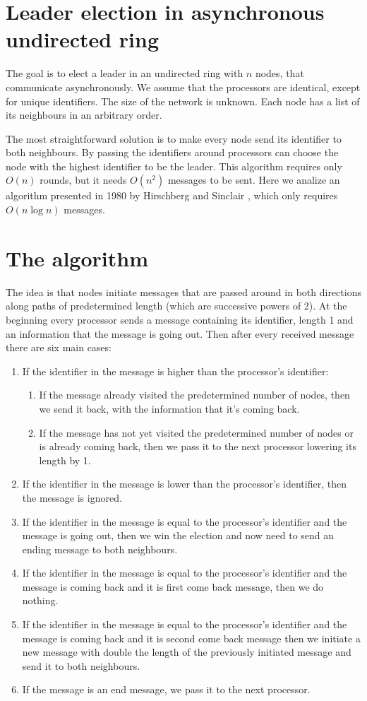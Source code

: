 \documentclass[a4paper,12pt]{article}
\begin{document}
\section{Leader election in asynchronous undirected ring}
The goal is to elect a leader in an undirected ring with $n$ nodes, that communicate asynchronously. We assume that the processors are identical, except for unique identifiers. The size of the network is unknown. Each node has a list of its neighbours in an arbitrary order.\par
The most straightforward solution is to make every node send its identifier to both neighbours. By passing the identifiers around processors can choose the node with the highest identifier to be the leader. This algorithm requires only $O(n)$ rounds, but it needs $O(n^2)$ messages to be sent. Here we analize an algorithm presented in 1980 by Hirschberg and Sinclair \cite{10.1145/359024.359029}, which only requires $O(n\log n)$ messages.

\section{The algorithm}
The idea is that nodes initiate messages that are passed around in both directions along paths of predetermined length (which are successive powers of 2). At the beginning every processor sends a message containing its identifier, length 1 and an information that the message is going out. Then after every received message there are six main cases:
\begin{enumerate}
    \item If the identifier in the message is higher than the processor's identifier:
    \begin{enumerate}
        \item If the message already visited the predetermined number of nodes, then we send it back, with the information that it's coming back.
        \item If the message has not yet visited the predetermined number of nodes or is already coming back, then we pass it to the next processor lowering its length by 1.
    \end{enumerate}
    \item If the identifier in the message is lower than the processor's identifier, then the message is ignored.
    \item If the identifier in the message is equal to the processor's identifier and the message is going out, then we win the election and now need to send an ending message to both neighbours.
    \item If the identifier in the message is equal to the processor's identifier and the message is coming back and it is first come back message, then we do nothing.
    \item If the identifier in the message is equal to the processor's identifier and the message is coming back and it is second come back message then we initiate a new message with double the length of the previously initiated message and send it to both neighbours.
    \item If the message is an end message, we pass it to the next processor.
\end{enumerate}
\end{document}
